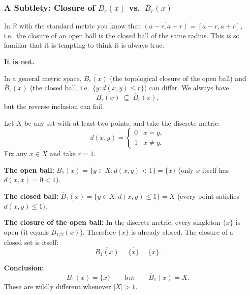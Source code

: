 %

\subsubsection{A Subtlety: Closure of $B_r(x)$ vs.\ $\overline{B}_r(x)$}
\label{sec:closure-vs-closed-ball}

In $\mathbb{R}$ with the standard metric you know that
$\overline{(a - r, a + r)} = [a - r, a + r]$,
i.e.\ the closure of an open ball is the closed ball of the same radius.
This is so familiar that it is tempting to think it is always true.

\textbf{It is not.}

\begin{remark*}
\label{rem:closure-vs-closed-ball}
In a general metric space, $\overline{B_r(x)}$ (the topological closure of the open ball)
and $\overline{B}_r(x)$ (the closed ball, i.e.\ $\{y : d(x,y) \le r\}$) can differ.
We always have
\[
\overline{B_r(x)} \;\subseteq\; \overline{B}_r(x),
\]
but the reverse inclusion can fail.
\end{remark*}

\begin{example}
\label{ex:closure-vs-closed-ball-discrete}
Let $X$ be any set with at least two points, and take the discrete metric:
\[
d(x,y) = \begin{cases} 0 & x = y, \\ 1 & x \neq y. \end{cases}
\]
Fix any $x \in X$ and take $r = 1$.

\medskip
\noindent
\textbf{The open ball:}
$B_1(x) = \{y \in X : d(x,y) < 1\} = \{x\}$ (only $x$ itself has $d(x,x) = 0 < 1$).

\medskip
\noindent
\textbf{The closed ball:}
$\overline{B}_1(x) = \{y \in X : d(x,y) \le 1\} = X$ (every point satisfies $d(x,y) \le 1$).

\medskip
\noindent
\textbf{The closure of the open ball:}
In the discrete metric, every singleton $\{x\}$ is open (it equals $B_{1/2}(x)$).
Therefore $\{x\}$ is already closed.
The closure of a closed set is itself:
\[
\overline{B_1(x)} = \overline{\{x\}} = \{x\}.
\]

\medskip
\noindent
\textbf{Conclusion:}
\[
\overline{B_1(x)} = \{x\}
\qquad\text{but}\qquad
\overline{B}_1(x) = X.
\]
These are wildly different whenever $|X| > 1$.
\end{example}

